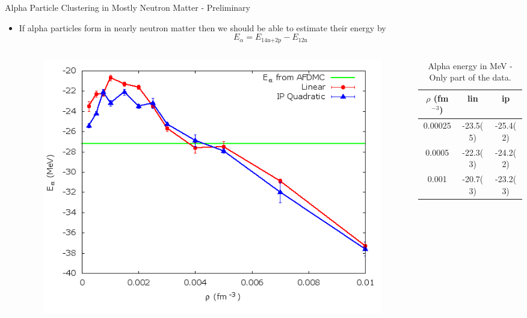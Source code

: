 \documentclass{beamer}
\begin{document}
\begin{frame}{\large Alpha Particle Clustering in Mostly Neutron Matter - Preliminary}
\begin{itemize}
   \item If alpha particles form in nearly neutron matter then we should be able to estimate their energy by
   \begin{equation*}
      E_\alpha = E_\text{14n+2p} - E_\text{12n}
   \end{equation*}
   \vspace{-0.25cm}
   \begin{columns}
   \begin{column}{0.6\textwidth}
   \begin{figure}[h]
      \centering
      \includegraphics[width=\textwidth]{../figures/alpha.png}
   \end{figure}
   \end{column}
   \hspace{-0.6cm}
   \begin{column}{0.4\textwidth}
   \vspace{-0.8cm}
   \begin{table}[h!]
      \footnotesize
      \centering
      \caption{Alpha energy in MeV - Only part of the data.}
      \begin{tabular}{ccc}
         \hline \hline
         $\rho$ (fm$^{-3}$) & lin & ip \\
         \hline
         0.00025  & -23.5(5)  & -25.4(2)  \\
         0.0005   & -22.3(3)  & -24.2(2)  \\
         0.001    & -20.7(3)  & -23.2(3)  \\

\end{tabular}
\end{table}
\end{column}
\end{columns}
\end{itemize}
\end{frame}
\end{document}
